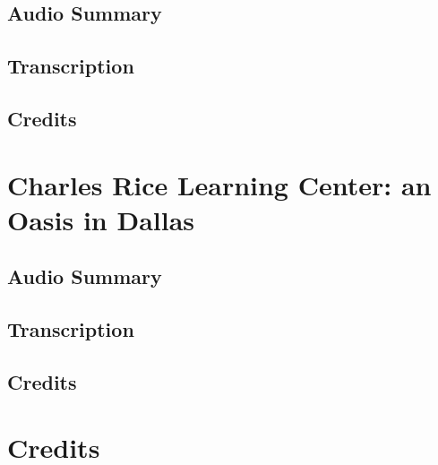 \subsection{Audio Summary}

\subsection{Transcription}

\subsection{Credits}

\section{Charles Rice Learning Center: an Oasis in Dallas}

\subsection{Audio Summary}

\subsection{Transcription}

\subsection{Credits}

\section{Credits}